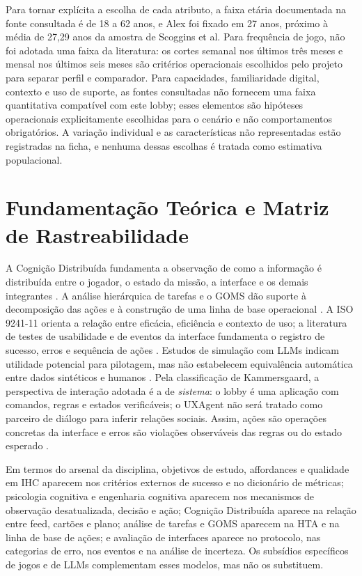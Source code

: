 \documentclass[conference]{IEEEtran}
\begin{document}
Para tornar explícita a escolha de cada atributo, a faixa etária documentada na fonte consultada é de 18 a 62 anos, e Alex foi fixado em 27 anos, próximo à média de 27,29 anos da amostra de Scoggins et al. Para frequência de jogo, não foi adotada uma faixa da literatura: os cortes semanal nos últimos três meses e mensal nos últimos seis meses são critérios operacionais escolhidos pelo projeto para separar perfil e comparador. Para capacidades, familiaridade digital, contexto e uso de suporte, as fontes consultadas não fornecem uma faixa quantitativa compatível com este lobby; esses elementos são hipóteses operacionais explicitamente escolhidas para o cenário e não comportamentos obrigatórios. A variação individual e as características não representadas estão registradas na ficha, e nenhuma dessas escolhas é tratada como estimativa populacional.


\section{Fundamentação Teórica e Matriz de Rastreabilidade}

A Cognição Distribuída fundamenta a observação de como a informação é distribuída entre o jogador, o estado da missão, a interface e os demais integrantes \cite{hollan2000}. A análise hierárquica de tarefas e o GOMS dão suporte à decomposição das ações e à construção de uma linha de base operacional \cite{benyon2010,dix2004}. A ISO 9241-11 orienta a relação entre eficácia, eficiência e contexto de uso; a literatura de testes de usabilidade e de eventos da interface fundamenta o registro de sucesso, erros e sequência de ações \cite{iso9241_11,saadawi2005}. Estudos de simulação com LLMs indicam utilidade potencial para pilotagem, mas não estabelecem equivalência automática entre dados sintéticos e humanos \cite{hamalainen2023,simuser2024}. Pela classificação de Kammersgaard, a perspectiva de interação adotada é a de \textit{sistema}: o lobby é uma aplicação com comandos, regras e estados verificáveis; o UXAgent não será tratado como parceiro de diálogo para inferir relações sociais. Assim, ações são operações concretas da interface e erros são violações observáveis das regras ou do estado esperado \cite{kammersgaard1988}.

Em termos do arsenal da disciplina, objetivos de estudo, affordances e qualidade em IHC aparecem nos critérios externos de sucesso e no dicionário de métricas; psicologia cognitiva e engenharia cognitiva aparecem nos mecanismos de observação desatualizada, decisão e ação; Cognição Distribuída aparece na relação entre feed, cartões e plano; análise de tarefas e GOMS aparecem na HTA e na linha de base de ações; e avaliação de interfaces aparece no protocolo, nas categorias de erro, nos eventos e na análise de incerteza. Os subsídios específicos de jogos e de LLMs complementam esses modelos, mas não os substituem.
\end{document}
